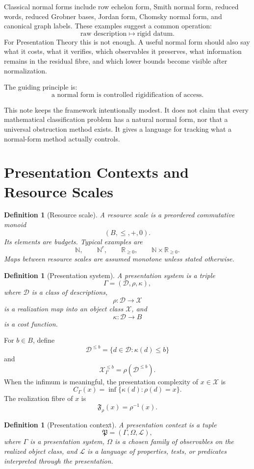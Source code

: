 \documentclass[11pt]{article}
\newtheorem{definition}[theorem]{Definition}
\begin{document}
Classical normal forms include row echelon form, Smith normal form, reduced words, reduced Grobner bases, Jordan form, Chomsky normal form, and canonical graph labels. These examples suggest a common operation:
\[
\text{raw description}\longmapsto \text{rigid datum}.
\]
For Presentation Theory this is not enough. A useful normal form should also say what it costs, what it verifies, which observables it preserves, what information remains in the residual fibre, and which lower bounds become visible after normalization.

The guiding principle is:
\[
\boxed{
\text{a normal form is controlled rigidification of access.}
}
\]

This note keeps the framework intentionally modest. It does not claim that every mathematical classification problem has a natural normal form, nor that a universal obstruction method exists. It gives a language for tracking what a normal-form method actually controls.

\section{Presentation Contexts and Resource Scales}

\begin{definition}[Resource scale]
A resource scale is a preordered commutative monoid
\[
(B,\leq,+,0).
\]
Its elements are budgets. Typical examples are
\[
\mathbb N,\qquad \mathbb N^r,\qquad \mathbb R_{\geq0},\qquad
\mathbb N\times\mathbb R_{\geq0}.
\]
Maps between resource scales are assumed monotone unless stated otherwise.
\end{definition}

\begin{definition}[Presentation system]
A presentation system is a triple
\[
\Gamma=(\mathcal D,\rho,\kappa),
\]
where \(\mathcal D\) is a class of descriptions,
\[
\rho:\mathcal D\to \mathcal X
\]
is a realization map into an object class \(\mathcal X\), and
\[
\kappa:\mathcal D\to B
\]
is a cost function.
\end{definition}

For \(b\in B\), define
\[
\mathcal D^{\leq b}=\{d\in\mathcal D:\kappa(d)\leq b\}
\]
and
\[
\mathcal X_\Gamma^{\leq b}=\rho(\mathcal D^{\leq b}).
\]
When the infimum is meaningful, the presentation complexity of \(x\in\mathcal X\) is
\[
C_\Gamma(x)=\inf\{\kappa(d):\rho(d)=x\}.
\]
The realization fibre of \(x\) is
\[
\mathfrak F_\rho(x)=\rho^{-1}(x).
\]

\begin{definition}[Presentation context]
A presentation context is a tuple
\[
\mathfrak P=(\Gamma,\Omega,\mathcal L),
\]
where \(\Gamma\) is a presentation system, \(\Omega\) is a chosen family of observables on the realized object class, and \(\mathcal L\) is a language of properties, tests, or predicates interpreted through the presentation.
\end{definition}
\end{document}
